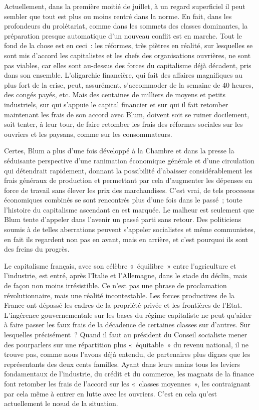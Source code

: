 \documentclass[french,twoside]{book} %
\begin{document}
Actuellement, dans la première moitié de juillet, à un regard superficiel il peut sembler que tout est plus ou moins rentré dans la norme. En fait, dans les profondeurs du prolétariat, comme dans les sommets des classes dominantes, la préparation presque automatique d’un nouveau conflit est en marche. Tout le fond de la chose est en ceci : les réformes, très piètres en réalité, sur lesquelles se sont mis d’accord les capitalistes et les chefs des organisations ouvrières, ne sont pas viables, car elles sont au-dessus des forces du capitalisme déjà décadent, pris dans son ensemble. L’oligarchie financière, qui fait des affaires magnifiques au plus fort de la crise, peut, assurément, s’accommoder de la semaine de 40 heures, des congés payés, etc. Mais des centaines de milliers de moyens et petits industriels, sur qui s’appuie le capital financier et sur qui il fait retomber maintenant les frais de son accord avec Blum, doivent soit se ruiner docilement, soit tenter, à leur tour, de faire retomber les frais  des réformes sociales sur les ouvriers et les paysans, comme sur les consommateurs.\par
Certes, Blum a plus d’une fois développé à la Chambre et dans la presse la séduisante perspective d’une ranimation économique générale et d’une circulation qui détendrait rapidement, donnant la possibilité d’abaisser considérablement les frais généraux de production et permettant par cela d’augmenter les dépenses en force de travail sans élever les prix des marchandises. C’est vrai, de tels processus économiques combinés se sont rencontrés plus d’une fois dans le passé ; toute l’histoire du capitalisme ascendant en est marquée. Le malheur est seulement que Blum tente d’appeler dans l’avenir un passé parti sans retour. Des politiciens soumis à de telles aberrations peuvent s’appeler socialistes et même communistes, en fait ils regardent non pas en avant, mais en arrière, et c’est pourquoi ils sont des freins du progrès.\par
Le capitalisme français, avec son célèbre « équilibre » entre l’agriculture et l’industrie, est entré, après l’Italie et l’Allemagne, dans le stade du déclin, mais de façon non moins irrésistible. Ce n’est pas une phrase de proclamation révolutionnaire, mais une réalité incontestable. Les forces productives de la France ont dépassé les cadres de la propriété privée et les frontières de l’Etat. L’ingérence gouvernementale sur les bases du régime capitaliste ne peut qu’aider à faire passer les faux frais de la décadence de certaines classes sur d’autres. Sur lesquelles précisément ? Quand il faut au président du Conseil socialiste mener des pourparlers sur une répartition plus « équitable » du revenu national, il ne trouve pas, comme nous l’avons déjà entendu, de partenaires plus dignes que les représentants des deux cents familles. Ayant dans leurs mains tous les leviers fondamentaux de l’industrie, du crédit et du commerce, les magnats de la finance font retomber les frais de l’accord sur les  « classes moyennes », les contraignant par cela même à entrer en lutte avec les ouvriers. C’est en cela qu’est actuellement le nœud de la situation.\par
\end{document}
